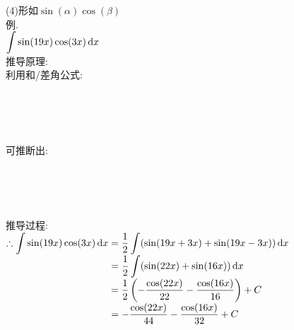 (4)形如$\sin(\alpha)\cos(\beta)$\\
例.\\
$\displaystyle\int\sin(19x)\cos(3x)\mathop{}\!\mathrm{d} x$\\
推导原理:\\
利用和/差角公式:
{\par\centering
    \\[2ex]
    \\[2ex]
    \\[2ex]
\par}\vspace{2ex}
可推断出:
{\par\centering
	\\[2ex]
	\\[2ex]
	\\[2ex]
\par}\newpage
推导过程:\\
$\displaystyle\therefore\int\sin(19x)\cos(3x)\mathop{}\!\mathrm{d} x=\frac{1}{2}\int(\sin(19x+3x)+\sin(19x-3x))\mathop{}\!\mathrm{d} x$\\
$\displaystyle\phantom{\therefore\int\sin(19x)\cos(3x)\dif x}=\frac{1}{2}\int(\sin(22x)+\sin(16x))\dif x$\\
$\displaystyle\phantom{\therefore\int\sin(19x)\cos(3x)\dif x}=\frac{1}{2}\left(-\frac{\cos(22x)}{22}-\frac{\cos(16x)}{16}\right)+C$\\
$\displaystyle\phantom{\therefore\int\sin(19x)\cos(3x)\dif x}=-\frac{\cos(22x)}{44}-\frac{\cos(16x)}{32}+C$\\[4ex]

